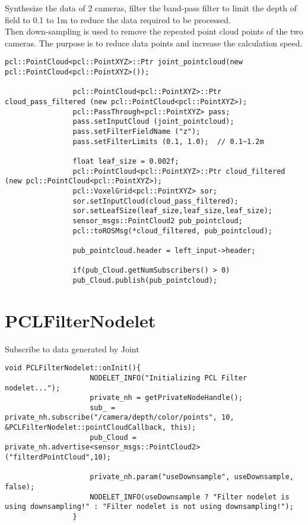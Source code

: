 			
			
			Synthesize the data of 2 cameras, filter the band-pass filter to limit the depth of field to 0.1 to 1m to reduce the data required to be processed.\\
			Then down-sampling is used to remove the repeated point cloud points of the two cameras. The purpose is to reduce data points and increase the calculation speed.
			\begin{lstlisting}[caption={}] pcl::PointCloud<pcl::PointXYZ>::Ptr joint_pointcloud(new pcl::PointCloud<pcl::PointXYZ>());
				
				pcl::PointCloud<pcl::PointXYZ>::Ptr cloud_pass_filtered (new pcl::PointCloud<pcl::PointXYZ>);
				pcl::PassThrough<pcl::PointXYZ> pass;
				pass.setInputCloud (joint_pointcloud);
				pass.setFilterFieldName ("z");
				pass.setFilterLimits (0.1, 1.0);  // 0.1~1.2m 
				
				float leaf_size = 0.002f;
				pcl::PointCloud<pcl::PointXYZ>::Ptr cloud_filtered (new pcl::PointCloud<pcl::PointXYZ>);
				pcl::VoxelGrid<pcl::PointXYZ> sor;    
				sor.setInputCloud(cloud_pass_filtered);            
				sor.setLeafSize(leaf_size,leaf_size,leaf_size);           
				sensor_msgs::PointCloud2 pub_pointcloud;
				pcl::toROSMsg(*cloud_filtered, pub_pointcloud);
				
				pub_pointcloud.header = left_input->header;
				
				if(pub_Cloud.getNumSubscribers() > 0)
				pub_Cloud.publish(pub_pointcloud);
			\end{lstlisting}
			
			\section{PCLFilterNodelet}
			Subscribe to data generated by Joint
			\begin{lstlisting}[caption={}]
				void PCLFilterNodelet::onInit(){
					NODELET_INFO("Initializing PCL Filter nodelet...");
					private_nh = getPrivateNodeHandle();
					sub_ = private_nh.subscribe("/camera/depth/color/points", 10, &PCLFilterNodelet::pointCloudCallback, this);
					pub_Cloud = private_nh.advertise<sensor_msgs::PointCloud2>("filterdPointCloud",10);
					
					private_nh.param("useDownsample", useDownsample, false);
					NODELET_INFO(useDownsample ? "Filter nodelet is using downsampling!" : "Filter nodelet is not using downsampling!");
				}
			\end{lstlisting}
			
